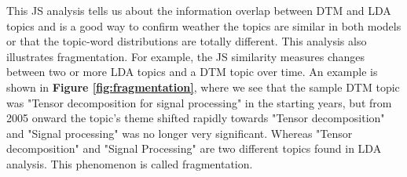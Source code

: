 This JS analysis tells us about the information overlap between DTM and LDA topics and is a good way to confirm weather the  topics are similar in both models or that the topic-word distributions are totally different. This analysis also illustrates fragmentation. For example, the JS similarity measures changes between two or more LDA topics and a DTM topic over time. An example is shown in \textbf{Figure \ref{fig:fragmentation}}, where we see that the sample DTM topic was "Tensor decomposition for signal processing" in the starting years, but from 2005 onward the topic's theme shifted rapidly towards "Tensor decomposition" and "Signal processing" was no longer very significant. Whereas "Tensor decomposition" and "Signal Processing" are two different topics found in LDA analysis. This phenomenon is called fragmentation.

